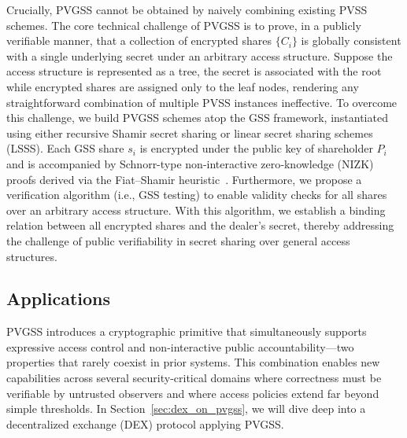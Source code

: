 \documentclass[runningheads]{llncs}
\begin{document}
Crucially, PVGSS cannot be obtained by naively combining existing PVSS schemes. The core technical challenge of PVGSS is to prove, in a publicly verifiable manner, that a collection of encrypted shares \(\{C_i\}\) is globally consistent with a single underlying secret under an arbitrary access structure. Suppose the access structure is represented as a tree, the secret is associated with the root while encrypted shares are assigned only to the leaf nodes, rendering any straightforward combination of multiple PVSS instances ineffective.
To overcome this challenge, we build PVGSS schemes atop the GSS framework, instantiated using either recursive Shamir secret sharing or linear secret sharing schemes (LSSS). Each GSS share \(s_i\) is encrypted under the public key of shareholder \(P_i\) and is accompanied by Schnorr-type non‑interactive zero‑knowledge (NIZK) proofs derived via the Fiat–Shamir heuristic~\cite{fiat1986prove}.
Furthermore, we propose a verification algorithm (i.e., GSS testing) to enable validity checks for all shares over an arbitrary access structure. With this algorithm, we establish a binding relation between all encrypted shares and the dealer’s secret, thereby addressing the challenge of public verifiability in secret sharing over general access structures.







\subsection{Applications}
\label{sec:other_applications}
PVGSS introduces a cryptographic primitive that simultaneously supports expressive access control and non-interactive public accountability—two properties that rarely coexist in prior systems. This combination enables new capabilities across several security-critical domains where correctness must be verifiable by untrusted observers and where access policies extend far beyond simple thresholds.
In Section~\ref{sec:dex_on_pvgss}, we will dive deep into a decentralized exchange (DEX) protocol applying PVGSS.
\end{document}
